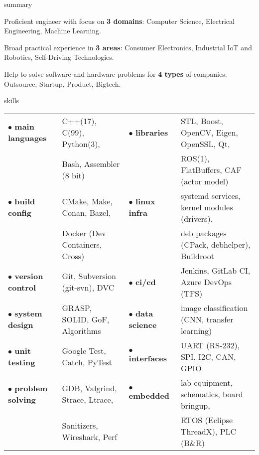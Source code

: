 \documentclass{Vladimir.Ivanov.CV}
\begin{document}
\begin{rSection}{summary}
\begin{rItemize}

\item Proficient engineer with focus on \textbf{3 domains}: Computer Science, Electrical Engineering, Machine Learning.
\item Broad practical experience in \textbf{3 areas}: Consumer Electronics, Industrial IoT and Robotics, Self-Driving Technologies.
\item Help to solve software and hardware problems for \textbf{4 types} of companies: Outsource, Startup, Product, Bigtech.

\end{rItemize}
\end{rSection}

\begin{rSection}{skills}
\begin{tabular}{llll}

$\bullet$ \textbf{main languages}  & C++(17), C(99), Python(3),      & $\bullet$ \textbf{libraries}    & STL, Boost, OpenCV, Eigen, OpenSSL, Qt,       \\
                                   & Bash, Assembler (8 bit)         &                                 & ROS(1), FlatBuffers, CAF (actor model)        \\
$\bullet$ \textbf{build config}    & CMake, Make, Conan, Bazel,      & $\bullet$ \textbf{linux infra}  & systemd services, kernel modules (drivers),   \\
                                   & Docker (Dev Containers, Cross)  &                                 & deb packages (CPack, debhelper), Buildroot    \\
$\bullet$ \textbf{version control} & Git, Subversion (git-svn), DVC  & $\bullet$ \textbf{ci/cd}        & Jenkins, GitLab CI, Azure DevOps (TFS)        \\
$\bullet$ \textbf{system design}   & GRASP, SOLID, GoF, Algorithms   & $\bullet$ \textbf{data science} & image classification (CNN, transfer learning) \\
$\bullet$ \textbf{unit testing}    & Google Test, Catch, PyTest      & $\bullet$ \textbf{interfaces}   & UART (RS-232), SPI, I2C, CAN, GPIO            \\
$\bullet$ \textbf{problem solving} & GDB, Valgrind, Strace, Ltrace,  & $\bullet$ \textbf{embedded}     & lab equipment, schematics, board bringup,     \\
                                   & Sanitizers, Wireshark, Perf     &                                 & RTOS (Eclipse ThreadX), PLC (B\&R)

\end{tabular}
\end{rSection}
\end{document}
